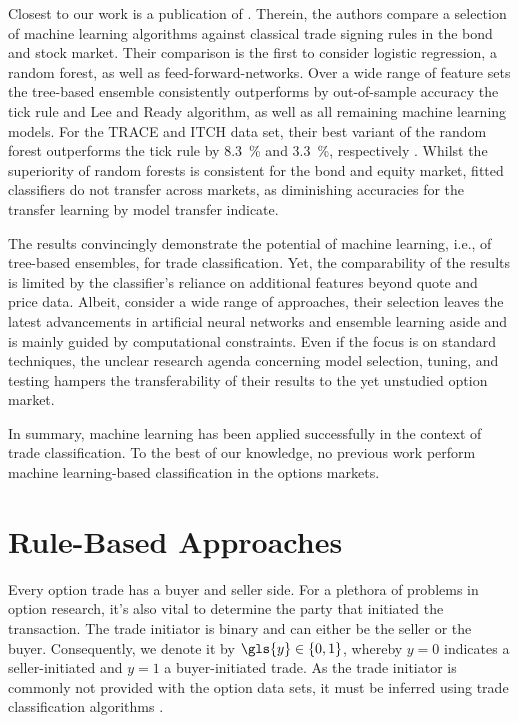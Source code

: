 Closest to our work is a publication of \textcite[1--58]{ronenMachineLearningTrade2022}. Therein, the authors compare a selection of machine learning algorithms against classical trade signing rules in the bond and stock market. Their comparison is the first to consider logistic regression, a random forest, as well as \glspl{feed-forward-network}. Over a wide range of feature sets the tree-based ensemble consistently outperforms by out-of-sample accuracy the tick rule and Lee and Ready algorithm, as well as all remaining machine learning models. For the \gls{TRACE} and ITCH data set, their best variant of the random forest outperforms the tick rule by \SI{8.3}{\percent} and \SI{3.3}{\percent}, respectively \autocite[57]{ronenMachineLearningTrade2022}. Whilst the superiority of random forests is consistent for the bond and equity market, fitted classifiers do not transfer across markets, as diminishing accuracies for the transfer learning by model transfer indicate.

The results convincingly demonstrate the potential of machine learning, i.e., of tree-based ensembles, for trade classification. Yet, the comparability of the results is limited by the classifier's reliance on additional features beyond quote and price data. Albeit, \textcite[4]{ronenMachineLearningTrade2022} consider a wide range of approaches, their selection leaves the latest advancements in artificial neural networks and ensemble learning aside and is mainly guided by computational constraints. Even if the focus is on standard techniques, the unclear research agenda concerning model selection, tuning, and testing hampers the transferability of their results to the yet unstudied option market.

In summary, machine learning has been applied successfully in the context of trade classification. To the best of our knowledge, no previous work perform machine learning-based classification in the options markets.

\newpage
\section{Rule-Based Approaches}\label{sec:rule-based-approaches}

Every option trade has a buyer and seller side. For a plethora of problems in option research, it's also vital to determine the party that initiated the transaction. The trade initiator is binary and can either be the seller or the buyer. Consequently, we denote it by $\gls{y} \in \{0,1\}$, whereby $y=0$ indicates a seller-initiated and $y=1$ a buyer-initiated trade. As the trade initiator is commonly not provided with the option data sets, it must be inferred using trade classification algorithms \autocite[][453]{easleyOptionVolumeStock1998}.

